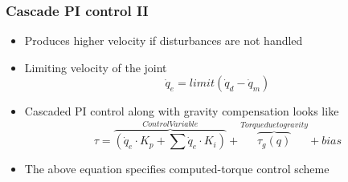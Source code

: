 \documentclass{beamer}
\begin{document}
\begin{frame}
	\frametitle{Cascade PI control II}
	\begin{itemize}
		\item Produces higher velocity if disturbances are not handled	
		\item Limiting velocity of the joint 
		\begin{equation}
			\dot{q}_e = limit(\dot{q}_d - \dot{q}_m)
		\end{equation}				
		\item Cascaded PI control along with gravity compensation looks like
\begin{equation}
\tau = \overbrace{(\dot{q}_e\cdot K_p + \sum \dot{q}_e\cdot K_i)}^{Control Variable} + \overbrace{\tau_g(q)}^{Torque due to gravity} + bias
\end{equation}
	\item The above equation specifies computed-torque control scheme
	\end{itemize}	
\end{frame}
\end{document}
